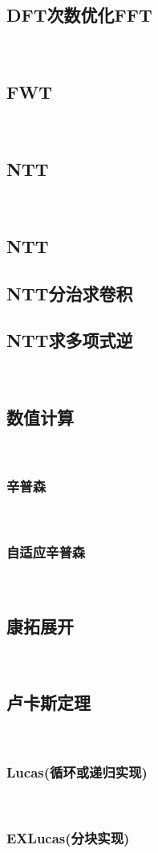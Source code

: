 \documentclass[twocolumn,a4]{article}
\newcommand{\addcpp}[1]{}
\begin{document}
		\subsection{DFT次数优化FFT}
			\addcpp{math/FFT_2}
​	\subsection{FWT}
​		%
​	\subsection{NTT}
​		\subsection{NTT}
			\addcpp{math/NTT}
		\subsection{NTT分治求卷积}
			\addcpp{math/NTT_cdq}
		\subsection{NTT求多项式逆}
			\addcpp{math/NTT_inv}
​	\subsection{数值计算}
​		\subsubsection{辛普森}
​			%
​		\subsubsection{自适应辛普森}
​			%
​	\subsection{康拓展开}
​		%
​	\subsection{卢卡斯定理}
​		\subsubsection{Lucas(循环或递归实现)}
​			\addcpp{math/Lucas}
​		\subsubsection{EXLucas(分块实现)}
​			\addcpp{math/EXLucas}
\end{document}

